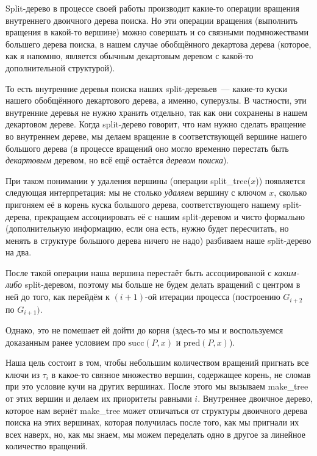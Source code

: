 \begin{remark} Split-дерево в процессе своей работы производит какие-то операции вращения внутреннего двоичного дерева поиска. Но эти операции вращения (выполнить вращения в какой-то вершине) можно совершать и со связными подмножествами большего дерева поиска, в нашем случае обобщённого декартова дерева (которое, как я напомню, является обычным декартовым деревом с какой-то дополнительной структурой).

То есть внутренние деревья поиска наших split-деревьев~--- какие-то куски нашего
обобщённого декартового дерева, а именно, суперузлы. В частности, эти внутренние
деревья не нужно хранить отдельно, так как они сохранены в нашем декартовом дереве.
Когда split-дерево говорит, что нам нужно сделать вращение во внутреннем дереве, мы делаем вращение в соответствующей вершине нашего большого дерева (в процессе вращений
оно могло временно перестать быть \emph{декартовым} деревом, но всё ещё остаётся \emph{деревом поиска}). 

При таком понимании у удаления вершины (операции \textrm{split\_tree}($x$)) появляется
следующая интерпретация: мы не столько \emph{удаляем} вершину с ключом $x$, сколько пригоняем её в корень куска большого дерева, соответствующего нашему split-дерева, прекращаем ассоциировать её с нашим split-деревом и чисто формально (дополнительную информацию, если она есть, нужно будет пересчитать, но менять в структуре большого дерева ничего не надо) разбиваем наше split-дерево на два. 

После такой операции наша вершина перестаёт быть ассоциированой с \emph{каким-либо} split-деревом, поэтому мы больше не будем делать вращений с центром в ней до того, как перейдём к $(i+1)$-ой итерации процесса (построению $G_{i+2}$ по $G_{i+1})$. 

Однако,
это не помешает ей дойти до корня (здесь-то мы и воспользуемся доказанным ранее
условием про $\mathrm{succ}(P, x)$ и $\mathrm{pred}(P, x)$). 
\end{remark}

Наша цель состоит в том, чтобы небольшим количеством вращений пригнать все
ключи из $\tau_i$ в какое-то связное множество вершин, содержащее корень, 
не сломав при это условие кучи на других вершинах.
После этого мы вызываем \textrm{make\_tree} от этих вершин и делаем их приоритеты
равными $i$. Внутреннее двоичное дерево, которое нам вернёт \textrm{make\_tree}
может отличаться от структуры двоичного дерева поиска на этих вершинах, которая получилась после того, как мы пригнали их всех наверх, но, как мы знаем, мы можем переделать одно в другое за линейное количество вращений.

